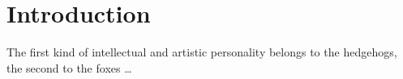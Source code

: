 \documentclass[a4paper,twoside]{ociamthesis}
\newcommand*{\bibtitle}{References}
\begin{document}
\flushbottom
\part{Introduction}

% 
% 


% 



\begin{savequote}[8cm]
The first kind of intellectual and artistic personality belongs to the hedgehogs, the second to the foxes \dots
\end{savequote}

\setlength{\baselineskip}{0pt} %

{\renewcommand*\MakeUppercase[1]{#1}%
\printbibliography[heading=bibintoc,title={\bibtitle}]}
\end{document}
